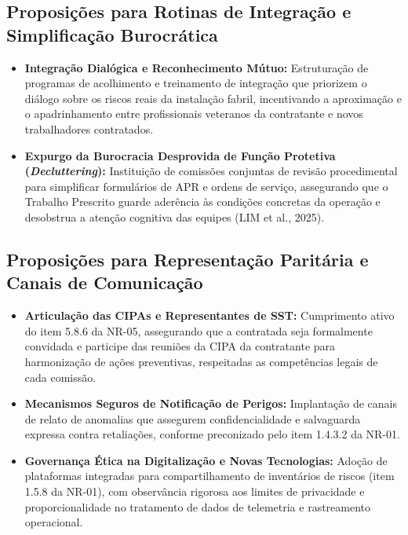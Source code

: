 \documentclass[12pt,a4paper]{article}
\begin{document}
\subsection{Proposições para Rotinas de Integração e Simplificação Burocrática}
\begin{itemize}[leftmargin=1.5cm]
  \item \textbf{Integração Dialógica e Reconhecimento Mútuo:} Estruturação de programas de acolhimento e treinamento de integração que priorizem o diálogo sobre os riscos reais da instalação fabril, incentivando a aproximação e o apadrinhamento entre profissionais veteranos da contratante e novos trabalhadores contratados.
  \item \textbf{Expurgo da Burocracia Desprovida de Função Protetiva (\textit{Decluttering}):} Instituição de comissões conjuntas de revisão procedimental para simplificar formulários de APR e ordens de serviço, assegurando que o Trabalho Prescrito guarde aderência às condições concretas da operação e desobstrua a atenção cognitiva das equipes (LIM et al., 2025).
\end{itemize}

\subsection{Proposições para Representação Paritária e Canais de Comunicação}
\begin{itemize}[leftmargin=1.5cm]
  \item \textbf{Articulação das CIPAs e Representantes de SST:} Cumprimento ativo do item 5.8.6 da NR-05, assegurando que a contratada seja formalmente convidada e participe das reuniões da CIPA da contratante para harmonização de ações preventivas, respeitadas as competências legais de cada comissão.
  \item \textbf{Mecanismos Seguros de Notificação de Perigos:} Implantação de canais de relato de anomalias que assegurem confidencialidade e salvaguarda expressa contra retaliações, conforme preconizado pelo item 1.4.3.2 da NR-01.
  \item \textbf{Governança Ética na Digitalização e Novas Tecnologias:} Adoção de plataformas integradas para compartilhamento de inventários de riscos (item 1.5.8 da NR-01), com observância rigorosa aos limites de privacidade e proporcionalidade no tratamento de dados de telemetria e rastreamento operacional.
\end{itemize}

\end{document}
